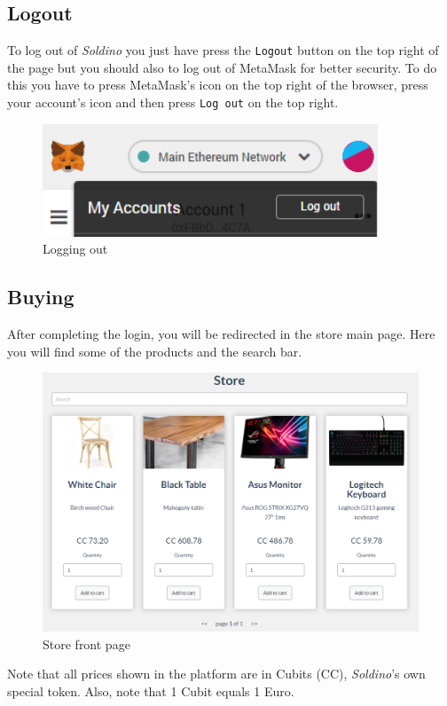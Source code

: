	\subsection{Logout}
	To log out of \textit{Soldino} you just have press the \texttt{Logout} button on 
	the top right of the page but you should also to log out of MetaMask\glosp{} 
	for better security. To do this you have to press MetaMask's icon on the top 
	right of the browser, press your account's icon and then press \texttt{Log out}
	on the top right.
	\begin{figure}[H]
		\includegraphics[width=10cm]{res/images/logout_metamask.png}
		\centering
		\caption{Logging out}
	\end{figure}
	\subsection{Buying}
	After completing the login, you will be redirected in the store main page. 
	Here you will find some of the products and the search bar.
	\begin{figure}[H]
		\includegraphics[width=15cm]{res/images/store_main_page.png}
		\centering
		\caption{Store front page}
	\end{figure}
	\noindent Note that all prices shown in the platform are in Cubits\glosp{}
	(CC\glo), \textit{Soldino}'s own special token. Also, note that 1 Cubit
	equals 1 Euro.
